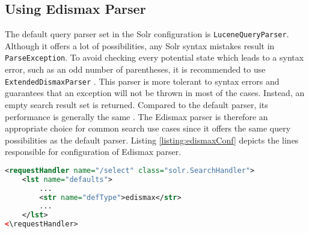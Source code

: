 \subsection{Using Edismax Parser}

The default query parser set in the Solr configuration is \texttt{LuceneQueryParser}. 
Although it offers a lot of possibilities, any Solr syntax mistakes result in \texttt{ParseEx\-ception}. 
To avoid checking every potential state which leads to a syntax error, such as an odd number of parentheses, it is recommended to use \texttt{Extended\-Dismax\-Parser} \cite{Solr3EnterpriseSS}.
This parser is more tolerant to syntax errors and guarantees that an exception will not be thrown in most of the cases. %
Instead, an empty search result set is returned.
Compared to the default parser, its performance is generally the same \cite{Solr3EnterpriseSS}. %
The Edismax parser is therefore an appropriate choice for common search use cases since it offers the same query possibilities as the default parser. %
Listing \ref{listing:edismaxConf} depicts the lines responsible for configuration of Edismax parser.

\begin{lstlisting}[language=XML, caption={Configuration of the Edismax parser.}, label={listing:edismaxConf}]
<requestHandler name="/select" class="solr.SearchHandler">
	<lst name="defaults">
		...
		<str name="defType">edismax</str>
		...
	</lst>
<\requestHandler>
\end{lstlisting}



%
%
%


